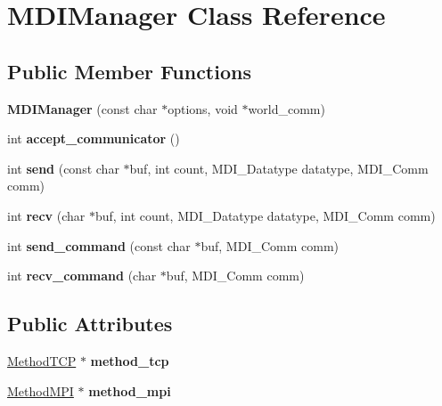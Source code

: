\hypertarget{classMDIManager}{\section{M\-D\-I\-Manager Class Reference}
\label{classMDIManager}
}
\subsection*{Public Member Functions}
\begin{DoxyCompactItemize}
\item 
\hypertarget{classMDIManager_a7d02f65b6ec14d2b94f30309fc297725}{{\bfseries M\-D\-I\-Manager} (const char $\ast$options, void $\ast$world\-\_\-comm)}\label{classMDIManager_a7d02f65b6ec14d2b94f30309fc297725}

\item 
\hypertarget{classMDIManager_aead8acfd8e9328b845015a8ba1b1ac01}{int {\bfseries accept\-\_\-communicator} ()}\label{classMDIManager_aead8acfd8e9328b845015a8ba1b1ac01}

\item 
\hypertarget{classMDIManager_acbd50272ac3d42086be3981c6107adc8}{int {\bfseries send} (const char $\ast$buf, int count, M\-D\-I\-\_\-\-Datatype datatype, M\-D\-I\-\_\-\-Comm comm)}\label{classMDIManager_acbd50272ac3d42086be3981c6107adc8}

\item 
\hypertarget{classMDIManager_a8a6caab0db63267bf117e44253943de9}{int {\bfseries recv} (char $\ast$buf, int count, M\-D\-I\-\_\-\-Datatype datatype, M\-D\-I\-\_\-\-Comm comm)}\label{classMDIManager_a8a6caab0db63267bf117e44253943de9}

\item 
\hypertarget{classMDIManager_ab154bc23f32381088e89848deac2f701}{int {\bfseries send\-\_\-command} (const char $\ast$buf, M\-D\-I\-\_\-\-Comm comm)}\label{classMDIManager_ab154bc23f32381088e89848deac2f701}

\item 
\hypertarget{classMDIManager_a0689b1d5ee97d5936c760dc8f6418ef4}{int {\bfseries recv\-\_\-command} (char $\ast$buf, M\-D\-I\-\_\-\-Comm comm)}\label{classMDIManager_a0689b1d5ee97d5936c760dc8f6418ef4}

\end{DoxyCompactItemize}
\subsection*{Public Attributes}
\begin{DoxyCompactItemize}
\item 
\hypertarget{classMDIManager_a81f7d832fd9e1fd6168874dcdcaf2ad1}{\hyperlink{classMethodTCP}{Method\-T\-C\-P} $\ast$ {\bfseries method\-\_\-tcp}}\label{classMDIManager_a81f7d832fd9e1fd6168874dcdcaf2ad1}

\item 
\hypertarget{classMDIManager_a7b320b241377c1a356245dbd2a3bc707}{\hyperlink{classMethodMPI}{Method\-M\-P\-I} $\ast$ {\bfseries method\-\_\-mpi}}\label{classMDIManager_a7b320b241377c1a356245dbd2a3bc707}

\end{DoxyCompactItemize}


